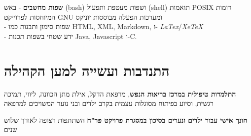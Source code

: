 {\textbf{שפות מחשבים}}
{- באש (bash) ושפות מעטפת ותפעול (shell) תואמות POSIX דומות המיוחסות לפרוייקט GNU ומערכות הפעלה מבוססות יוניקס \\ 
	- שפות סימון ותבנות כמו HTML, XML, Markdown, ו-
	\textit{LaTex}/\textit{XeTeX} \\
	- ידע שטחי בשפות תכנות Java, Javascript ו-C.}
{}

\section{התנדבות ועשייה למען הקהילה}

{\textbf{התלמדות טיפולית במרכז בריאות הנפש}, מרפאת הדקל, אילת}
{מתן הכוונה, ליווי, תמיכה רגשית, וסיוע בפיתוח מסוגלות עצמית בקרב ילדים ובני נוער המשויכים למרפאה}
{}

{\textbf{חונך אישי עבור ילדים ונערים בסיכון במסגרת פרויקט פר"ח}}
{השתתפות רצופה לאורך שלוש שנים}
{}		
\unsetRTL